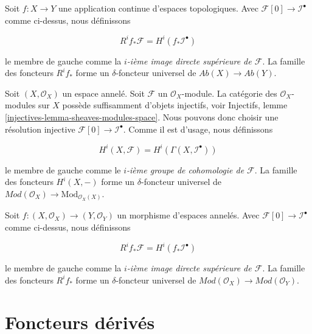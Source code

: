 \medskip\noindent

Soit $f : X \to Y$ une application continue d'espaces topologiques. Avec
$\mathcal{F}[0] \to \mathcal{I}^\bullet$ comme ci-dessus, nous définissons

\begin{equation}
\label{equation-higher-direct-image}
R^if_*\mathcal{F} = H^i(f_*\mathcal{I}^\bullet)
\end{equation}

le membre de gauche comme la {\it $i$-ième image directe supérieure de $\mathcal{F}$}. La famille des foncteurs $R^if_*$ forme un $\delta$-foncteur universel de $\textit{Ab}(X) \to \textit{Ab}(Y)$.

\medskip\noindent

Soit $(X, \mathcal{O}_X)$ un espace annelé. Soit $\mathcal{F}$ un
$\mathcal{O}_X$-module. La catégorie des $\mathcal{O}_X$-modules sur $X$ possède suffisamment d'objets injectifs, voir Injectifs, lemme \ref{injectives-lemma-sheaves-modules-space}. Nous pouvons donc choisir une résolution injective
$\mathcal{F}[0] \to \mathcal{I}^\bullet$. Comme il est d'usage, nous définissons

\begin{equation}
\label{equation-cohomology-modules}
H^i(X, \mathcal{F}) = H^i(\Gamma(X, \mathcal{I}^\bullet))
\end{equation}

le membre de gauche comme le {\it $i$-ième groupe de cohomologie de $\mathcal{F}$}. La famille des foncteurs $H^i(X, -)$ forme un $\delta$-foncteur universel de $\textit{Mod}(\mathcal{O}_X) \to \text{Mod}_{\mathcal{O}_X(X)}$.

\medskip\noindent

Soit $f : (X, \mathcal{O}_X) \to (Y, \mathcal{O}_Y)$ un morphisme d'espaces annelés. Avec $\mathcal{F}[0] \to \mathcal{I}^\bullet$ comme ci-dessus, nous définissons

\begin{equation}
\label{equation-higher-direct-image-modules}
R^if_*\mathcal{F} = H^i(f_*\mathcal{I}^\bullet)
\end{equation}

le membre de gauche comme la {\it $i$-ième image directe supérieure de $\mathcal{F}$}. La famille des foncteurs $R^if_*$ forme un $\delta$-foncteur universel de $\textit{Mod}(\mathcal{O}_X) \to \textit{Mod}(\mathcal{O}_Y)$.





\section{Foncteurs dérivés}

